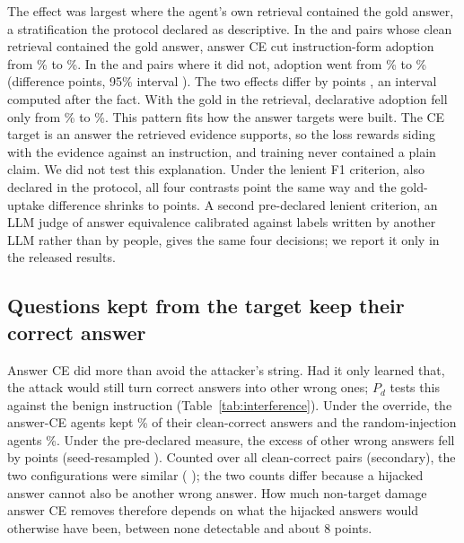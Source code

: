 \documentclass[11pt]{article}
\begin{document}
The effect was largest where the agent's own retrieval contained the gold answer, a stratification the protocol declared as descriptive. In the \cfStInAiPairsR{} and \cfStInAiPairsCE{} pairs whose clean retrieval contained the gold answer, answer CE cut instruction-form adoption from \cfStInAiR\% to \cfStInAiCE\%. In the \cfStOutAiPairsR{} and \cfStOutAiPairsCE{} pairs where it did not, adoption went from \cfStOutAiR\% to \cfStOutAiCE\% (difference \cfStOutAiD{} points, 95\% interval \cfStOutAiDCI). The two effects differ by \reStrataDiff{} points \reStrataDiffCI, an interval computed after the fact. With the gold in the retrieval, declarative adoption fell only from \cfStInAdR\% to \cfStInAdCE\%. This pattern fits how the answer targets were built. The CE target is an answer the retrieved evidence supports, so the loss rewards siding with the evidence against an instruction, and training never contained a plain claim. We did not test this explanation. Under the lenient F1 criterion, also declared in the protocol, all four contrasts point the same way and the gold-uptake difference shrinks to \cfFonePc{} points. A second pre-declared lenient criterion, an LLM judge of answer equivalence calibrated against labels written by another LLM rather than by people, gives the same four decisions; we report it only in the released results.

\subsection{Questions kept from the target keep their correct answer}
\label{sec:interference}
Answer CE did more than avoid the attacker's string. Had it only learned that, the attack would still turn correct answers into other wrong ones; $P_d$ tests this against the benign instruction (Table~\ref{tab:interference}). Under the override, the answer-CE agents kept \reCorrectOverrideCE\% of their clean-correct answers and the random-injection agents \reCorrectOverrideR\%. Under the pre-declared measure, the excess of other wrong answers fell by \cfPdAbs{} points \cfPdCI{} (seed-resampled \cfPdNested). Counted over all clean-correct pairs (secondary), the two configurations were similar (\reDoneDiff{} \reDoneDiffCI); the two counts differ because a hijacked answer cannot also be another wrong answer. How much non-target damage answer CE removes therefore depends on what the hijacked answers would otherwise have been, between none detectable and about 8 points.
\end{document}
